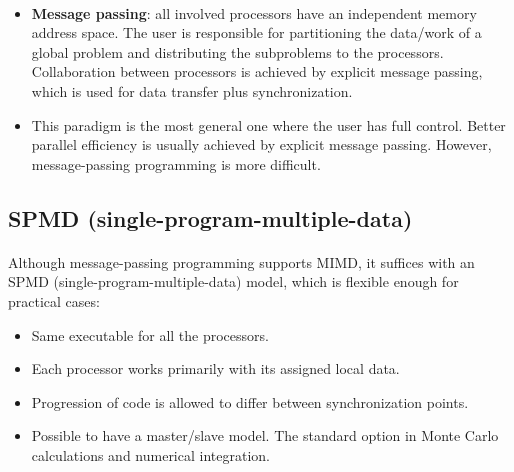 \documentclass[%
twoside,                 %
final,                   %
10pt]{article}
\begin{document}
\paragraph{}

\begin{itemize}
\item \textbf{Message passing}:  all involved processors have an independent memory address space. The user is responsible for  partitioning the data/work of a global problem and distributing the  subproblems to the processors. Collaboration between processors is achieved by explicit message passing, which is used for data transfer plus synchronization.

\item This paradigm is the most general one where the user has full control. Better parallel efficiency is usually achieved by explicit message passing. However, message-passing programming is more difficult.
\end{itemize}

\noindent


\subsection{SPMD (single-program-multiple-data)}

\paragraph{}

Although message-passing programming supports MIMD, it 
suffices with an SPMD (single-program-multiple-data) model, which
is flexible enough for practical cases:

\begin{itemize}
\item Same executable for all the processors.

\item Each processor works primarily with its assigned local data.

\item Progression of code is allowed to differ between synchronization points.

\item Possible to have a master/slave model. The standard option in Monte Carlo calculations and numerical integration.
\end{itemize}
\end{document}

